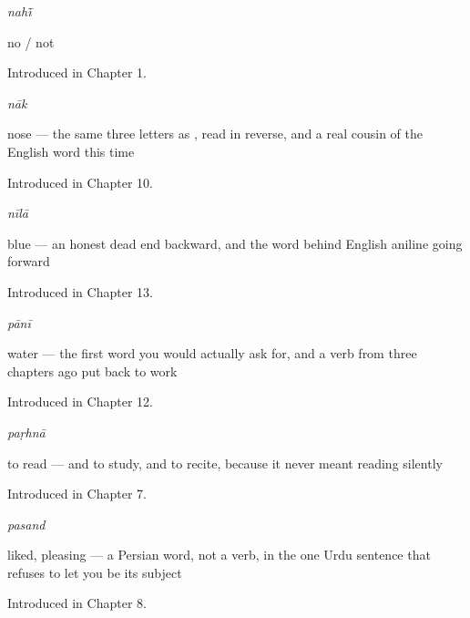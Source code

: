 \noindent\begin{minipage}[t]{\linewidth}
\raggedright
\textbf{}\enspace\emph{nahī̃}\par
\small no / not\par
\footnotesize Introduced in Chapter 1.
\end{minipage}\par\medskip

\noindent\begin{minipage}[t]{\linewidth}
\raggedright
\textbf{}\enspace\emph{nāk}\par
\small nose — the same three letters as , read in reverse, and a real cousin of the English word this time\par
\footnotesize Introduced in Chapter 10.
\end{minipage}\par\medskip

\noindent\begin{minipage}[t]{\linewidth}
\raggedright
\textbf{}\enspace\emph{nīlā}\par
\small blue — an honest dead end backward, and the word behind English aniline going forward\par
\footnotesize Introduced in Chapter 13.
\end{minipage}\par\medskip

\noindent\begin{minipage}[t]{\linewidth}
\raggedright
\textbf{}\enspace\emph{pānī}\par
\small water — the first word you would actually ask for, and a verb from three chapters ago put back to work\par
\footnotesize Introduced in Chapter 12.
\end{minipage}\par\medskip

\noindent\begin{minipage}[t]{\linewidth}
\raggedright
\textbf{}\enspace\emph{paṛhnā}\par
\small to read — and to study, and to recite, because it never meant reading silently\par
\footnotesize Introduced in Chapter 7.
\end{minipage}\par\medskip

\noindent\begin{minipage}[t]{\linewidth}
\raggedright
\textbf{}\enspace\emph{pasand}\par
\small liked, pleasing — a Persian word, not a verb, in the one Urdu sentence that refuses to let you be its subject\par
\footnotesize Introduced in Chapter 8.
\end{minipage}\par\medskip

